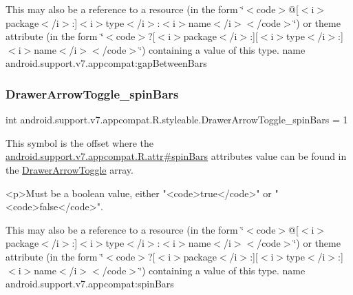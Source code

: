 This may also be a reference to a resource (in the form \char`\"{}$<$code$>$@\mbox{[}$<$i$>$package$<$/i$>$\+:\mbox{]}$<$i$>$type$<$/i$>$\+:$<$i$>$name$<$/i$>$$<$/code$>$\char`\"{}) or theme attribute (in the form \char`\"{}$<$code$>$?\mbox{[}$<$i$>$package$<$/i$>$\+:\mbox{]}\mbox{[}$<$i$>$type$<$/i$>$\+:\mbox{]}$<$i$>$name$<$/i$>$$<$/code$>$\char`\"{}) containing a value of this type.  name android.\+support.\+v7.\+appcompat\+:gap\+Between\+Bars \mbox{\label{classandroid_1_1support_1_1v7_1_1appcompat_1_1R_1_1styleable_a22785cf0da7609e82faa84d7f2aa2f93}} 
\subsubsection{\texorpdfstring{Drawer\+Arrow\+Toggle\+\_\+spin\+Bars}{DrawerArrowToggle\_spinBars}}
{\footnotesize\ttfamily int android.\+support.\+v7.\+appcompat.\+R.\+styleable.\+Drawer\+Arrow\+Toggle\+\_\+spin\+Bars = 1\hspace{0.3cm}{\ttfamily [static]}}

This symbol is the offset where the \hyperlink{classandroid_1_1support_1_1v7_1_1appcompat_1_1R_1_1attr_a691f13c5cbd10190f66459c7744ea5f0}{android.\+support.\+v7.\+appcompat.\+R.\+attr\#spin\+Bars} attribute\textquotesingle{}s value can be found in the \hyperlink{classandroid_1_1support_1_1v7_1_1appcompat_1_1R_1_1styleable_a7bd3ecc07eb763b454c40c0871959a35}{Drawer\+Arrow\+Toggle} array.

\begin{DoxyVerb}      <p>Must be a boolean value, either "<code>true</code>" or "<code>false</code>".
\end{DoxyVerb}
 

This may also be a reference to a resource (in the form \char`\"{}$<$code$>$@\mbox{[}$<$i$>$package$<$/i$>$\+:\mbox{]}$<$i$>$type$<$/i$>$\+:$<$i$>$name$<$/i$>$$<$/code$>$\char`\"{}) or theme attribute (in the form \char`\"{}$<$code$>$?\mbox{[}$<$i$>$package$<$/i$>$\+:\mbox{]}\mbox{[}$<$i$>$type$<$/i$>$\+:\mbox{]}$<$i$>$name$<$/i$>$$<$/code$>$\char`\"{}) containing a value of this type.  name android.\+support.\+v7.\+appcompat\+:spin\+Bars \mbox{\label{classandroid_1_1support_1_1v7_1_1appcompat_1_1R_1_1styleable_af9c043f5d15f590d94caaa0afa21c0dd}} 
